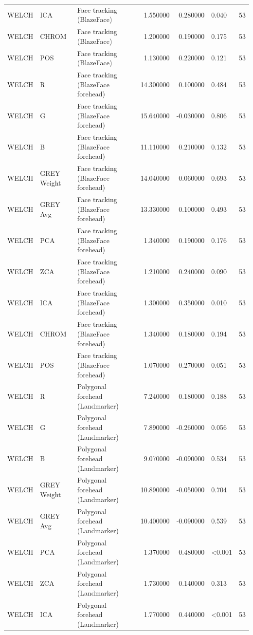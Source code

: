 \begin{table}[htbp]
\begin{tabular}{l l l r r l r}
WELCH & ICA & Face tracking (BlazeFace) & 1.550000 & 0.280000 & 0.040 & 53 \\
WELCH & CHROM & Face tracking (BlazeFace) & 1.200000 & 0.190000 & 0.175 & 53 \\
WELCH & POS & Face tracking (BlazeFace) & 1.130000 & 0.220000 & 0.121 & 53 \\
WELCH & R & Face tracking (BlazeFace forehead) & 14.300000 & 0.100000 & 0.484 & 53 \\
WELCH & G & Face tracking (BlazeFace forehead) & 15.640000 & -0.030000 & 0.806 & 53 \\
WELCH & B & Face tracking (BlazeFace forehead) & 11.110000 & 0.210000 & 0.132 & 53 \\
WELCH & GREY Weight & Face tracking (BlazeFace forehead) & 14.040000 & 0.060000 & 0.693 & 53 \\
WELCH & GREY Avg & Face tracking (BlazeFace forehead) & 13.330000 & 0.100000 & 0.493 & 53 \\
WELCH & PCA & Face tracking (BlazeFace forehead) & 1.340000 & 0.190000 & 0.176 & 53 \\
WELCH & ZCA & Face tracking (BlazeFace forehead) & 1.210000 & 0.240000 & 0.090 & 53 \\
WELCH & ICA & Face tracking (BlazeFace forehead) & 1.300000 & 0.350000 & 0.010 & 53 \\
WELCH & CHROM & Face tracking (BlazeFace forehead) & 1.340000 & 0.180000 & 0.194 & 53 \\
WELCH & POS & Face tracking (BlazeFace forehead) & 1.070000 & 0.270000 & 0.051 & 53 \\
WELCH & R & Polygonal forehead (Landmarker) & 7.240000 & 0.180000 & 0.188 & 53 \\
WELCH & G & Polygonal forehead (Landmarker) & 7.890000 & -0.260000 & 0.056 & 53 \\
WELCH & B & Polygonal forehead (Landmarker) & 9.070000 & -0.090000 & 0.534 & 53 \\
WELCH & GREY Weight & Polygonal forehead (Landmarker) & 10.890000 & -0.050000 & 0.704 & 53 \\
WELCH & GREY Avg & Polygonal forehead (Landmarker) & 10.400000 & -0.090000 & 0.539 & 53 \\
WELCH & PCA & Polygonal forehead (Landmarker) & 1.370000 & 0.480000 & <0.001 & 53 \\
WELCH & ZCA & Polygonal forehead (Landmarker) & 1.730000 & 0.140000 & 0.313 & 53 \\
WELCH & ICA & Polygonal forehead (Landmarker) & 1.770000 & 0.440000 & <0.001 & 53 \\

\end{tabular}
\end{table}
